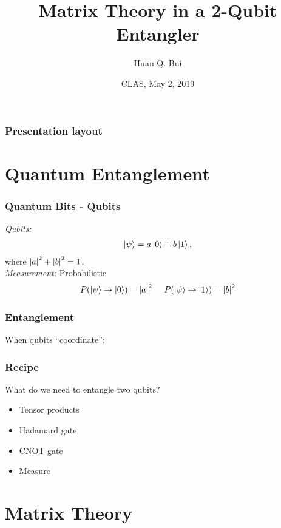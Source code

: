\documentclass{beamer}
\title{Matrix Theory in a 2-Qubit Entangler}
\author[Huan Q. Bui] %
{Huan Q. Bui}
\institute[Colby College] %
{
	
	Matrix Analysis
	\and
	Professor Leo Livshits
}
\date{CLAS, May 2, 2019}
\theoremstyle{definition}
\begin{document}
 
\frame{\titlepage}
 
\begin{frame}
\frametitle{Presentation layout}
\tableofcontents
\end{frame}

\section{Quantum Entanglement}

\begin{frame}
\frametitle{Quantum Bits - Qubits}

\textit{Qubits:}
\begin{align*}
\left\vert{\psi}\right\rangle = a\left\vert{0}\right\rangle + b\left\vert{1}\right\rangle,
\end{align*}
where $\abs{a}^2 + \abs{b}^2 = 1$. \\
$\,$\\
\textit{Measurement: } Probabilistic
\begin{align*}
P(\left\vert{\psi}\right\rangle \to \left\vert{0}\right\rangle) = \abs{a}^2\hspace{0.5cm}
P(\left\vert{\psi}\right\rangle \to \left\vert{1}\right\rangle) = \abs{b}^2
\end{align*}
\end{frame}


\begin{frame}
\frametitle{Entanglement}
When qubits ``coordinate'':


\end{frame}



\begin{frame}
\frametitle{Recipe}

What do we need to entangle two qubits?
\begin{itemize}
	\item Tensor products
	\item Hadamard gate
	\item CNOT gate
	\item Measure
\end{itemize}
\end{frame}








\section{Matrix Theory}
\end{document}
